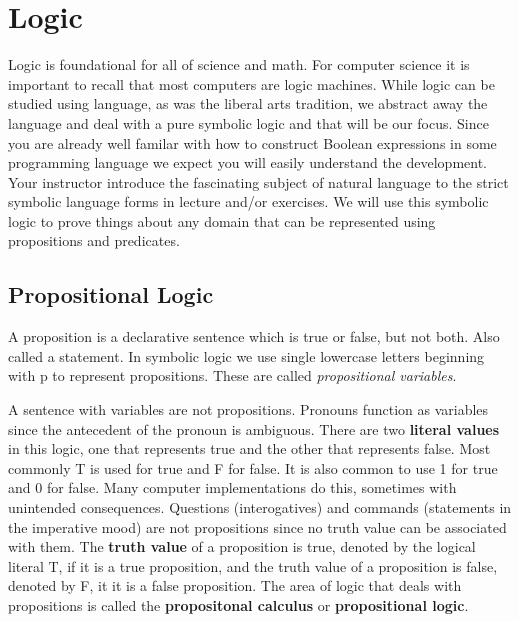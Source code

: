 \chapter {Logic}
Logic is foundational for all of science and math. For computer science it is important to recall that most computers are logic machines. While logic can be studied using language, as was the liberal arts tradition, we abstract away the language and deal with a pure symbolic logic and that will be our focus. Since you are already well familar with how to construct Boolean expressions in some programming language we expect you will easily understand the development. Your instructor introduce the fascinating subject of natural language to the strict symbolic language forms in lecture and/or exercises. We will use this symbolic logic to prove things about any domain that can be represented using propositions and predicates.


\section {Propositional Logic}
\begin {definition}[Proposition] 
A proposition is a declarative sentence which is true or false, but not both. Also called a statement. In symbolic logic we use single lowercase letters beginning with p to represent propositions. These are called \textit{propositional variables}.
\end {definition}

\begin{notes}
A sentence with variables are not propositions. Pronouns function as variables since the antecedent of the pronoun is ambiguous. There are two \textbf{literal values} in this logic, one that represents true and the other that represents false. Most commonly T is used for true and F for false. It is also common to use 1 for true and 0 for false. Many computer implementations do this, sometimes with unintended consequences. Questions (interogatives) and commands (statements in the imperative mood) are not propositions since no truth value can be associated with them. The \textbf{truth value} of a proposition is true, denoted by the logical literal T, if it is a true proposition, and the truth value of a proposition is false, denoted by F, it it is a false proposition. The area of logic that deals with propositions is called the \textbf{propositonal calculus} or \textbf{propositional logic}. 
\end{notes}

